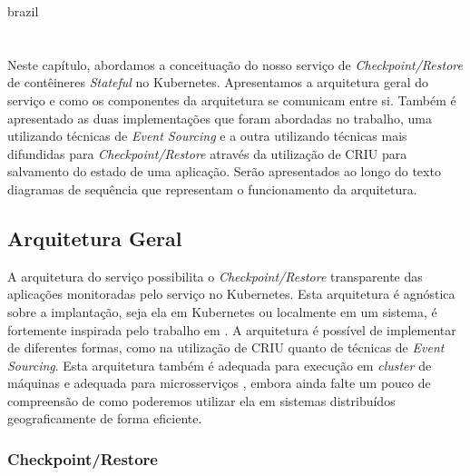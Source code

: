 

\begin{otherlanguage*}{brazil}

\chapter{}\label{cap:servico}

Neste capítulo, abordamos a conceituação do nosso serviço de
\textit{Checkpoint/Restore} de contêineres \textit{Stateful} no Kubernetes.
Apresentamos a arquitetura geral do serviço e como os componentes da arquitetura
se comunicam entre si. Também é apresentado as duas implementações que foram
abordadas no trabalho, uma utilizando técnicas de \textit{Event Sourcing} e a
outra utilizando técnicas mais difundidas para \textit{Checkpoint/Restore} através
da utilização de CRIU para salvamento do estado de uma aplicação. Serão apresentados
ao longo do texto diagramas de sequência que representam o funcionamento da
arquitetura.

\section{Arquitetura Geral}

A arquitetura do serviço possibilita o \textit{Checkpoint/Restore} transparente das
aplicações monitoradas pelo serviço no Kubernetes. Esta arquitetura é agnóstica sobre
a implantação, seja ela em Kubernetes ou localmente em um sistema, é fortemente inspirada
pelo trabalho em \cite{muller2022architecture}. A arquitetura é possível de implementar
de diferentes formas, como na utilização de CRIU quanto de técnicas de
\textit{Event Sourcing}. Esta arquitetura também é adequada para execução em
\textit{cluster} de máquinas e adequada para microsserviços \citep{vayghan2021kubernetes}
\cite{muller2022architecture} \cite{oh2018stateful}, embora ainda falte um pouco de
compreensão de como poderemos utilizar ela em sistemas distribuídos geograficamente
de forma eficiente.

\subsection{Checkpoint/Restore}


\end{otherlanguage*}
